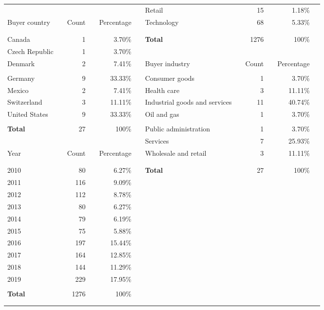 \documentclass[A4,11pt]{article}
\renewcommand{\~}[1]{\tilde{#1}}
\renewcommand{\-}[1]{\overline{#1}}
\begin{document}
\begin{table}[h]
{{\begin{tabular}{%
lc@{\hspace{.2em}}rc@{\hspace{.2em}}rc@{\hspace{.9em}}lc@{\hspace{.2em}}rc@{\hspace{.2em}}rc
}
  &&  &&  && Retail && 15 && 1.18\% \\[3pt] 
 Buyer country && {Count} && {Percentage} && Technology && 68 && 5.33\% \\[3pt] \cline{1-1}\cline{3-3}\cline{5-5}\\[-10pt] \cline{7-11}\\[-10pt] 
 Canada && 1 && 3.70\% && \textbf{Total} && 1276 && 100\% \\[3pt] 
 Czech Republic && 1 && 3.70\% &&  &&  &&  \\[3pt] 
 Denmark && 2 && 7.41\% && Buyer industry && {Count} && {Percentage} \\[3pt] \cline{7-7}\cline{9-9}\cline{11-11}\\[-10pt] 
 Germany && 9 && 33.33\% && Consumer goods && 1 && 3.70\% \\[3pt] 
 Mexico && 2 && 7.41\% && Health care && 3 && 11.11\% \\[3pt] 
 Switzerland && 3 && 11.11\% && Industrial goods and services && 11 && 40.74\% \\[3pt] 
 United States && 9 && 33.33\% && Oil and gas && 1 && 3.70\% \\[3pt] \cline{1-5}\\[-10pt] 
 \textbf{Total} && 27 && 100\% && Public administration && 1 && 3.70\% \\[3pt] 
  &&  &&  && Services && 7 && 25.93\% \\[3pt] 
 Year && {Count} && {Percentage} && Wholesale and retail && 3 && 11.11\% \\[3pt] \cline{1-1}\cline{3-3}\cline{5-5}\\[-10pt] \cline{7-11}\\[-10pt] 
 2010 && 80 && 6.27\% && \textbf{Total} && 27 && 100\% \\[3pt] 
 2011 && 116 && 9.09\% &&  &&  &&  \\[3pt] 
 2012 && 112 && 8.78\% &&  &&  &&  \\[3pt] 
 2013 && 80 && 6.27\% &&  &&  &&  \\[3pt] 
 2014 && 79 && 6.19\% &&  &&  &&  \\[3pt] 
 2015 && 75 && 5.88\% &&  &&  &&  \\[3pt] 
 2016 && 197 && 15.44\% &&  &&  &&  \\[3pt] 
 2017 && 164 && 12.85\% &&  &&  &&  \\[3pt] 
 2018 && 144 && 11.29\% &&  &&  &&  \\[3pt] 
 2019 && 229 && 17.95\% &&  &&  &&  \\[3pt] \cline{1-5}\\[-10pt] 
 \textbf{Total} && 1276 && 100\% &&  &&  &&  \\[3pt] 
  &&  &&  &&  &&  &&  \\[3pt]  \\\hline
\end{tabular}
}%
}
\end{table}%
\end{document}
